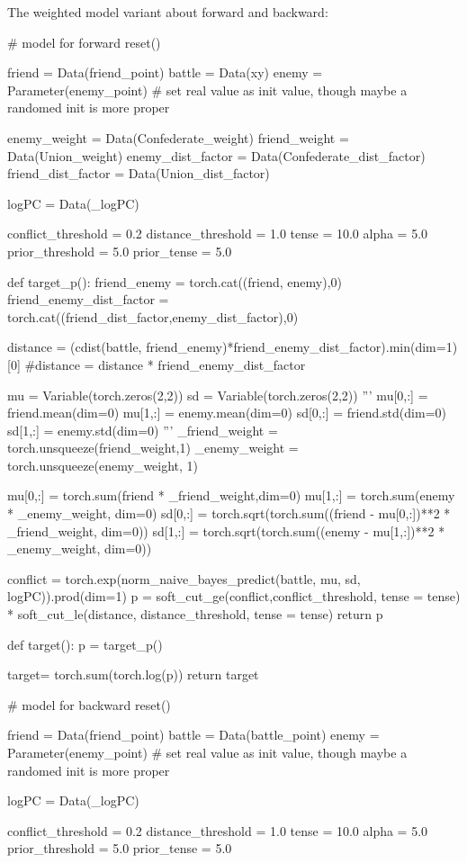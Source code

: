 \documentclass{article}
\begin{document}
The weighted model variant about forward and backward:

\begin{python}
# model for forward
reset()

friend = Data(friend_point)
battle = Data(xy)
enemy = Parameter(enemy_point) # set real value as init value, though maybe a randomed init is more proper

enemy_weight = Data(Confederate_weight)
friend_weight = Data(Union_weight)
enemy_dist_factor = Data(Confederate_dist_factor)
friend_dist_factor = Data(Union_dist_factor)


logPC = Data(_logPC)

conflict_threshold = 0.2
distance_threshold = 1.0
tense = 10.0
alpha = 5.0
prior_threshold = 5.0
prior_tense = 5.0

def target_p():
    friend_enemy = torch.cat((friend, enemy),0)
    friend_enemy_dist_factor = torch.cat((friend_dist_factor,enemy_dist_factor),0)
    
    distance = (cdist(battle, friend_enemy)*friend_enemy_dist_factor).min(dim=1)[0]
    #distance = distance * friend_enemy_dist_factor

    mu = Variable(torch.zeros(2,2)) 
    sd = Variable(torch.zeros(2,2))
    '''
    mu[0,:] = friend.mean(dim=0)
    mu[1,:] = enemy.mean(dim=0)
    sd[0,:] = friend.std(dim=0)
    sd[1,:] = enemy.std(dim=0)
    '''
    _friend_weight = torch.unsqueeze(friend_weight,1)
    _enemy_weight  = torch.unsqueeze(enemy_weight, 1)
    
    mu[0,:] = torch.sum(friend * _friend_weight,dim=0)
    mu[1,:] = torch.sum(enemy  * _enemy_weight, dim=0)
    sd[0,:] = torch.sqrt(torch.sum((friend - mu[0,:])**2 * _friend_weight, dim=0))
    sd[1,:] = torch.sqrt(torch.sum((enemy  - mu[1,:])**2 * _enemy_weight, dim=0))
    
    conflict = torch.exp(norm_naive_bayes_predict(battle, mu, sd, logPC)).prod(dim=1)
    p = soft_cut_ge(conflict,conflict_threshold, tense = tense) * soft_cut_le(distance, distance_threshold, tense = tense)
    return p

def target():
    p = target_p()
    
    target= torch.sum(torch.log(p))
    return target
    
# model for backward
reset()

friend = Data(friend_point)
battle = Data(battle_point)
enemy = Parameter(enemy_point) # set real value as init value, though maybe a randomed init is more proper

logPC = Data(_logPC)

conflict_threshold = 0.2
distance_threshold = 1.0
tense = 10.0
alpha = 5.0
prior_threshold = 5.0
prior_tense = 5.0


\end{python}
\end{document}
